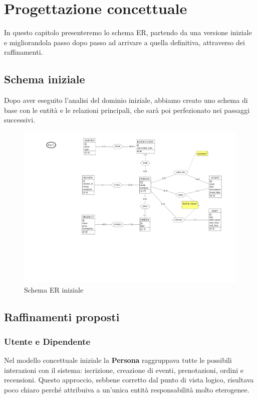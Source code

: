 \documentclass[a4paper,12pt]{report}
\begin{document}
\chapter{Progettazione concettuale}
In questo capitolo presenteremo lo schema ER, partendo da una versione iniziale e migliorandola 
passo dopo passo ad arrivare a quella definitiva, attraverso dei raffinamenti.

\section{Schema iniziale}
Dopo aver eseguito l'analisi del dominio iniziale, abbiamo creato uno schema di base con
le entità e le relazioni principali, che sarà poi perfezionato nei passaggi successivi.
\begin{figure}[H]
	\centering
	\includegraphics[width=\textwidth, trim=200pt 170pt 50pt 0pt, clip]{./schemas/base.pdf}
	\caption{Schema ER iniziale}
	\label{fig:schema-iniziale}
\end{figure}

\section{Raffinamenti proposti}
\subsection{Utente e Dipendente}
Nel modello concettuale iniziale la \textbf{Persona} raggruppava tutte le possibili interazioni 
con il sistema: iscrizione, creazione di eventi, prenotazioni, ordini e recensioni. Questo 
approccio, sebbene corretto dal punto di vista logico, risultava poco chiaro perché attribuiva 
a un'unica entità responsabilità molto eterogenee.
\end{document}
